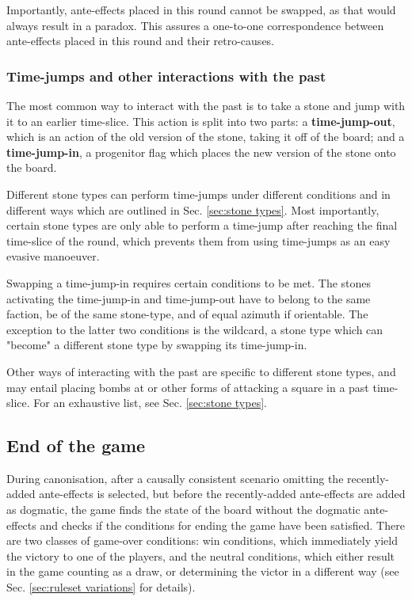 \documentclass[12pt]{article}
\begin{document}
	Importantly, ante-effects placed in this round cannot be swapped, as that would always result in a paradox. This assures a one-to-one correspondence between ante-effects placed in this round and their retro-causes.
	
	\subsubsection{Time-jumps and other interactions with the past} \label{sec:timejumps}
	The most common way to interact with the past is to take a stone and jump with it to an earlier time-slice. This action is split into two parts: a \textbf{time-jump-out}, which is an action of the old version of the stone, taking it off of the board; and a \textbf{time-jump-in}, a progenitor flag which places the new version of the stone onto the board.
	
	Different stone types can perform time-jumps under different conditions and in different ways which are outlined in Sec. \ref{sec:stone types}. Most importantly, certain stone types are only able to perform a time-jump after reaching the final time-slice of the round, which prevents them from using time-jumps as an easy evasive manoeuver.
	
	Swapping a time-jump-in requires certain conditions to be met. The stones activating the time-jump-in and time-jump-out have to belong to the same faction, be of the same stone-type, and of equal azimuth if orientable. The exception to the latter two conditions is the wildcard, a stone type which can "become" a different stone type by swapping its time-jump-in.
	
	Other ways of interacting with the past are specific to different stone types, and may entail placing bombs at or other forms of attacking a square in a past time-slice. For an exhaustive list, see Sec. \ref{sec:stone types}.
	
	\subsection{End of the game}
	During canonisation, after a causally consistent scenario omitting the recently-added ante-effects is selected, but before the recently-added ante-effects are added as dogmatic, the game finds the state of the board without the dogmatic ante-effects and checks if the conditions for ending the game have been satisfied. There are two classes of game-over conditions: win conditions, which immediately yield the victory to one of the players, and the neutral conditions, which either result in the game counting as a draw, or determining the victor in a different way (see Sec. \ref{sec:ruleset variations} for details).
	
\end{document}
